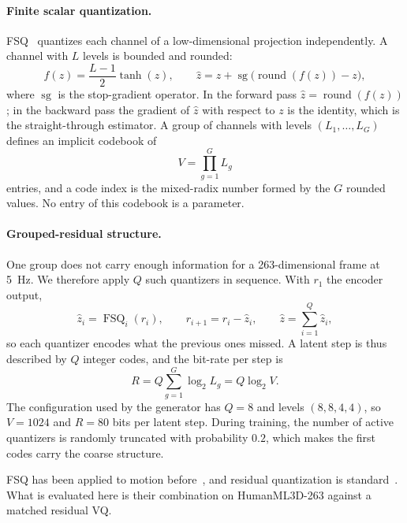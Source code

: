 \paragraph{Finite scalar quantization.} FSQ~\cite{mentzer2023fsq} quantizes each channel of a low-dimensional projection independently. A channel with $L$ levels is bounded and rounded:
\begin{equation}
f(z) = \frac{L-1}{2}\tanh(z), \qquad \hat{z} = z + \operatorname{sg}\bigl(\operatorname{round}(f(z)) - z\bigr),
\label{eq:fsq}
\end{equation}
where $\operatorname{sg}$ is the stop-gradient operator. In the forward pass $\hat{z} = \operatorname{round}(f(z))$; in the backward pass the gradient of $\hat{z}$ with respect to $z$ is the identity, which is the straight-through estimator. A group of channels with levels $(L_1, \dots, L_G)$ defines an implicit codebook of
\begin{equation}
V = \prod_{g=1}^{G} L_g
\end{equation}
entries, and a code index is the mixed-radix number formed by the $G$ rounded values. No entry of this codebook is a parameter.

\paragraph{Grouped-residual structure.} One group does not carry enough information for a 263-dimensional frame at 5~Hz. We therefore apply $Q$ such quantizers in sequence. With $r_1$ the encoder output,
\begin{equation}
\hat{z}_i = \operatorname{FSQ}_i(r_i), \qquad r_{i+1} = r_i - \hat{z}_i, \qquad \hat{z} = \sum_{i=1}^{Q} \hat{z}_i ,
\label{eq:residual}
\end{equation}
so each quantizer encodes what the previous ones missed. A latent step is thus described by $Q$ integer codes, and the bit-rate per step is
\begin{equation}
R = Q \sum_{g=1}^{G} \log_2 L_g = Q \log_2 V .
\end{equation}
The configuration used by the generator has $Q = 8$ and levels $(8, 8, 4, 4)$, so $V = 1024$ and $R = 80$ bits per latent step. During training, the number of active quantizers is randomly truncated with probability $0.2$, which makes the first codes carry the coarse structure.

FSQ has been applied to motion before~\cite{lu2024scamo,wang2025stmsq}, and residual quantization is standard~\cite{guo2024momask}. What is evaluated here is their combination on HumanML3D-263 against a matched residual VQ.

